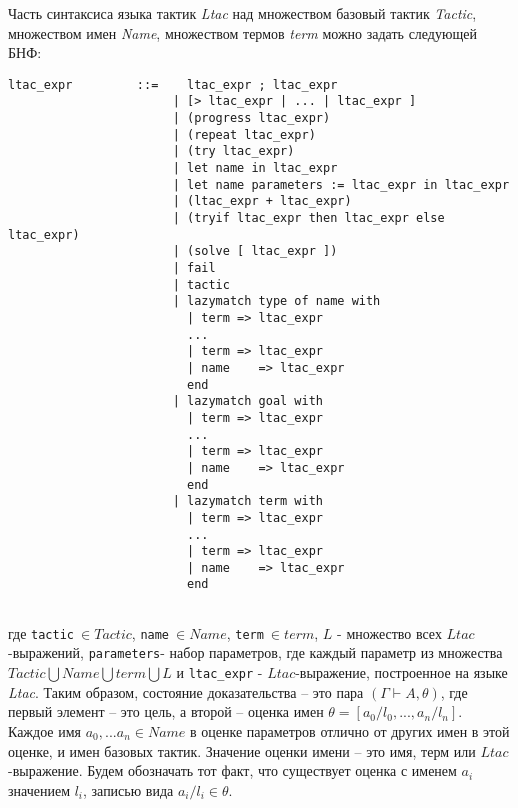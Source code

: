 \documentclass[12pt]{article}
\begin{document}
Часть синтаксиса  языка тактик \textit{Ltac} над множеством базовый тактик \textit{Tactic}, множеством имен \textit{Name}, множеством термов \textit{term} можно задать следующей БНФ:

\makeatletter
\def\verbatim@font{\linespread{1}\normalfont\ttfamily}
\makeatother
\begin{verbatim}
ltac_expr         ::=    ltac_expr ; ltac_expr
                       | [> ltac_expr | ... | ltac_expr ]
                       | (progress ltac_expr)
                       | (repeat ltac_expr)
                       | (try ltac_expr)
                       | let name in ltac_expr
                       | let name parameters := ltac_expr in ltac_expr
                       | (ltac_expr + ltac_expr)
                       | (tryif ltac_expr then ltac_expr else ltac_expr)
                       | (solve [ ltac_expr ])
                       | fail
                       | tactic
                       | lazymatch type of name with 
                         | term => ltac_expr 
                         ...
                         | term => ltac_expr
                         | name    => ltac_expr
                         end
                       | lazymatch goal with 
                         | term => ltac_expr 
                         ...
                         | term => ltac_expr
                         | name    => ltac_expr
                         end
                       | lazymatch term with 
                         | term => ltac_expr 
                         ...
                         | term => ltac_expr
                         | name    => ltac_expr
                         end
                        
\end{verbatim}
где \verb|tactic|$\ \in Tactic$, \verb|name|$\ \in Name$, \verb|term|$\ \in term$, $L$ - множество всех $Ltac$-выражений,
\verb|parameters|- набор параметров, где каждый параметр из множества $Tactic \bigcup Name \bigcup term \bigcup L$ и \verb|ltac_expr| - $Ltac$-выражение, построенное на языке \textit{Ltac}. 
Таким образом, состояние доказательства -- это пара $(\Gamma \vdash A,\theta)$, где первый элемент -- это цель, а второй -- оценка имен $\theta = [a_0/l_0, ..., a_n/l_n]$. Каждое имя $a_0,...a_n \in Name$ в оценке параметров отлично от других имен в этой оценке, и имен базовых тактик. Значение оценки имени -- это имя, терм или $Ltac$-выражение. Будем обозначать тот факт, что существует оценка с именем $a_i$ значением $l_i$, записью вида $a_i/l_i \in \theta$.
\end{document}
